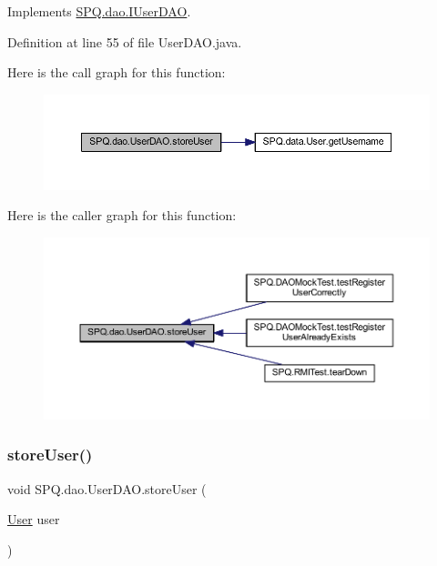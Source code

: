 Implements \mbox{\hyperlink{interface_s_p_q_1_1dao_1_1_i_user_d_a_o_a286f084c9e920d1ce196658ab63ab0af}{S\+P\+Q.\+dao.\+I\+User\+D\+AO}}.



Definition at line 55 of file User\+D\+A\+O.\+java.

Here is the call graph for this function\+:\nopagebreak
\begin{figure}[H]
\begin{center}
\leavevmode
\includegraphics[width=350pt]{class_s_p_q_1_1dao_1_1_user_d_a_o_ad86d4148c7f3fd960fb32de7c68f3f6a_cgraph}
\end{center}
\end{figure}
Here is the caller graph for this function\+:\nopagebreak
\begin{figure}[H]
\begin{center}
\leavevmode
\includegraphics[width=350pt]{class_s_p_q_1_1dao_1_1_user_d_a_o_ad86d4148c7f3fd960fb32de7c68f3f6a_icgraph}
\end{center}
\end{figure}
\mbox{\label{class_s_p_q_1_1dao_1_1_user_d_a_o_a9cc4105782c52054e71fa4938b55f7aa}} 
\subsubsection{\texorpdfstring{store\+User()}{storeUser()}\hspace{0.1cm}{\footnotesize\ttfamily [2/2]}}
{\footnotesize\ttfamily void S\+P\+Q.\+dao.\+User\+D\+A\+O.\+store\+User (\begin{DoxyParamCaption}\item[{\mbox{\hyperlink{class_s_p_q_1_1data_1_1_user}{User}}}]{user }\end{DoxyParamCaption})}



